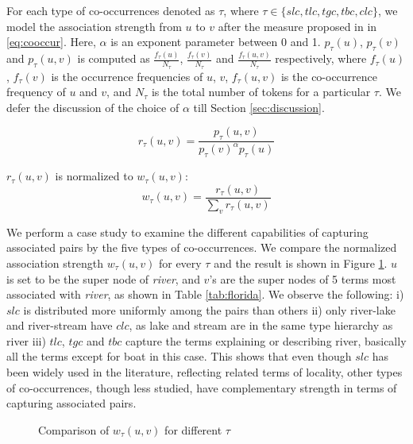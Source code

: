 \documentclass[letterpaper]{article}
\newcommand{\secref}[1]{Section \ref{#1}}
\newcommand{\figref}[1]{Figure \ref{#1}}
\newcommand{\tabref}[1]{Table \ref{#1}}
\begin{document}
For each type of co-occurrences denoted as $\tau$, where $\tau\in \{slc,
tlc, tgc, tbc, clc\}$, we model the association strength from $u$ to
$v$ after the measure proposed in \cite{Wettler:1993}
in \eqref{eq:cooccur}. Here, $\alpha$ is an exponent
parameter between 0 and 1. $p_\tau(u)$, $p_\tau(v)$ and $p_\tau(u,v)$ is
computed as $\frac{f_\tau(u)}{N_\tau}$, $\frac{f_\tau(v)}{N_\tau}$ and
$\frac{f_\tau(u,v)}{N_\tau}$ respectively, where $f_\tau(u)$, $f_\tau(v)$ is the
occurrence frequencies of $u$, $v$, $f_\tau(u,v)$ is the co-occurrence
frequency of $u$ and $v$, and $N_\tau$ is the total number of tokens
for a particular $\tau$. We defer the discussion of the choice of $\alpha$ 
till \secref{sec:discussion}.

\begin{equation}
r_\tau(u,v) = \frac{p_\tau(u,v)}{p_\tau(v)^\alpha p_\tau(u)}
\label{eq:cooccur}
\end{equation}

$r_\tau(u, v)$ is normalized to $w_\tau(u, v)$:
\begin{equation}
w_\tau(u, v) = \frac {r_\tau(u,v)} {\sum_{v}r_\tau(u,v)}
\label{eq:normalize2}
\end{equation}

We perform a case study to examine the different capabilities of
capturing associated pairs by the five types of co-occurrences.
We compare the normalized association strength $w_\tau(u, v)$ for 
every $\tau$ and the result is shown in \figref{fig:distribution}. 
$u$ is set to be the super node of {\em river}, 
and $v$'s are the super nodes of 5 terms most associated with {\em river},
as shown in \tabref{tab:florida}.
We observe the following:
i) $slc$ is distributed more uniformly
among the pairs than others ii) only river-lake and river-stream
have $clc$, as lake and stream are in the same type hierarchy as
river iii) $tlc$, $tgc$ and $tbc$ capture the terms explaining or
describing river, basically all the terms except for boat in this
case. This shows that even though $slc$ has been widely used in 
the literature, reflecting related terms of locality, 
other types of co-occurrences, though less studied, 
have complementary strength in terms of capturing associated pairs.

\begin{figure}[htb]
\centering
{}
\caption{Comparison of $w_\tau(u, v)$ for different $\tau$}
\label{fig:distribution}
\end{figure}
\end{document}
